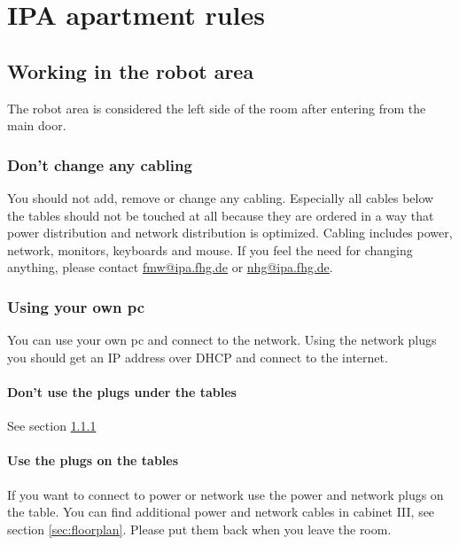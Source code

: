 \chapter{IPA apartment rules}\label{chap:apartment-rules}


\section{Working in the robot area}
The robot area is considered the left side of the room after entering from the main door.

\subsection{Don't change any cabling}\label{sec:cabling}
You should not add, remove or change any cabling. Especially all cables below the tables should not be touched at all because they are ordered in a way that power distribution and network distribution is optimized. Cabling includes power, network, monitors, keyboards and mouse. If you feel the need for changing anything, please contact \href{mailto:fmw@ipa.fhg.de}{fmw@ipa.fhg.de} or \href{mailto:nhg@ipa.fhg.de}{nhg@ipa.fhg.de}.

\subsection{Using your own pc}
You can use your own pc and connect to the network. Using the network plugs you should get an IP address over DHCP and connect to the internet.

\subsubsection{Don't use the plugs under the tables}
See section \ref{sec:cabling}

\subsubsection{Use the plugs on the tables}
If you want to connect to power or network use the power and network plugs on the table. You can find additional power and network cables in cabinet III, see section \ref{sec:floorplan}. Please put them back when you leave the room.

